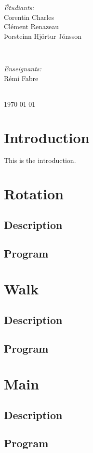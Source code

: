 \documentclass[11pt, a4paper]{article}
\begin{document}
\begin{titlepage}
\begin{minipage}{0.4\textwidth} %
\begin{flushleft} \large %
\emph{Étudiants:}
\\
Corentin Charles
\\
Clément Renazeau
\\
Þorsteinn Hjörtur Jónsson %
\end{flushleft}
\end{minipage}
~
\begin{minipage}{0.4\textwidth}
\begin{flushright} \large %
\vspace{-1cm}
\emph{Enseignants:} 
\\
Rémi Fabre
\\

\end{flushright}
\end{minipage}\\[3cm]
\nopagebreak      %
{\large \today}\\[3cm] %
\null
\end{titlepage}
\clearpage
\section{Introduction}
This is the introduction.\\
\clearpage
\section{Rotation}
\subsection{Description}
\subsection{Program}

\clearpage
\section{Walk}
\subsection{Description}
\subsection{Program}

\clearpage
\section{Main}
\subsection{Description}
\subsection{Program}

\clearpage

\vspace{1.5cm}
\end{document}

